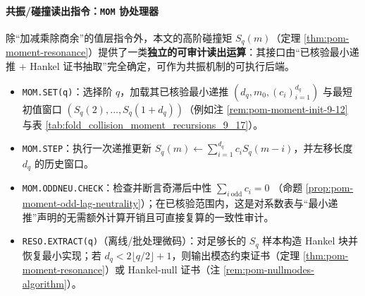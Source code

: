 \paragraph{共振/碰撞读出指令：\texttt{MOM} 协处理器}
除“加减乘除商余”的值层指令外，本文的高阶碰撞矩 \(S_q(m)\)（定理 \ref{thm:pom-moment-resonance}）提供了一类\textbf{独立的可审计读出运算}：其接口由“已核验最小递推 + Hankel 证书抽取”完全确定，可作为共振机制的可执行后端。
\begin{itemize}
  \item \texttt{MOM.SET(q)}：选择阶 \(q\)，加载其已核验最小递推 \((d_q,m_0,(c_i)_{i=1}^{d_q})\) 与最短初值窗口 \((S_q(2),\dots,S_q(1+d_q))\)（例如注 \ref{rem:pom-moment-init-9-12} 与表 \ref{tab:fold_collision_moment_recursions_9_17}）。
  \item \texttt{MOM.STEP}：执行一次递推更新
  \(
  S_q(m)\leftarrow \sum_{i=1}^{d_q} c_i S_q(m-i)
  \)，并左移长度 \(d_q\) 的历史窗口。
  \item \texttt{MOM.ODDNEU.CHECK}：检查并断言奇滞后中性
  \(
  \sum_{i\ \mathrm{odd}} c_i=0
  \)
  （命题 \ref{prop:pom-moment-odd-lag-neutrality}）；在已核验范围内，这是对系数表与“最小递推”声明的无需额外计算开销且可直接复算的一致性审计。
  \item \texttt{RESO.EXTRACT(q)}（离线/批处理微码）：对足够长的 \(S_q\) 样本构造 Hankel 块并恢复最小实现；若 \(d_q<2\lfloor q/2\rfloor+1\)，则输出模态约束证书（定理 \ref{thm:pom-moment-resonance}）或 Hankel-null 证书（注 \ref{rem:pom-nullmodes-algorithm}）。
\end{itemize}

